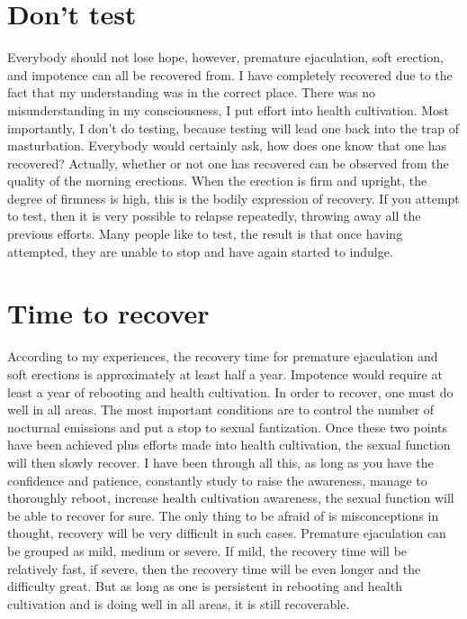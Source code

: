 \documentclass[
]{book}
\begin{document}
\hypertarget{dont-test}{%
\section{Don't test}\label{dont-test}}

Everybody should not lose hope, however, premature ejaculation, soft erection, and impotence can all be recovered from. I have completely recovered due to the fact that my understanding was in the correct place. There was no misunderstanding in my consciousness, I put effort into health cultivation. Most importantly, I don't do testing, because testing will lead one back into the trap of masturbation. Everybody would certainly ask, how does one know that one has recovered? Actually, whether or not one has recovered can be observed from the quality of the morning erections. When the erection is firm and upright, the degree of firmness is high, this is the bodily expression of recovery. If you attempt to test, then it is very possible to relapse repeatedly, throwing away all the previous efforts. Many people like to test, the result is that once having attempted, they are unable to stop and have again started to indulge.

\hypertarget{time-to-recover}{%
\section{Time to recover}\label{time-to-recover}}

According to my experiences, the recovery time for premature ejaculation and soft erections is approximately at least half a year. Impotence would require at least a year of rebooting and health cultivation. In order to recover, one must do well in all areas. The most important conditions are to control the number of nocturnal emissions and put a stop to sexual fantization. Once these two points have been achieved plus efforts made into health cultivation, the sexual function will then slowly recover. I have been through all this, as long as you have the confidence and patience, constantly study to raise the awareness, manage to thoroughly reboot, increase health cultivation awareness, the sexual function will be able to recover for sure. The only thing to be afraid of is misconceptions in thought, recovery will be very difficult in such cases. Premature ejaculation can be grouped as mild, medium or severe. If mild, the recovery time will be relatively fast, if severe, then the recovery time will be even longer and the difficulty great. But as long as one is persistent in rebooting and health cultivation and is doing well in all areas, it is still recoverable.
\end{document}
